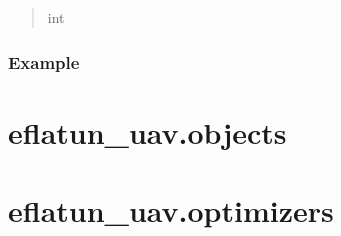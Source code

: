\documentclass[letterpaper,10pt,english]{sphinxmanual}
\begin{document}
\begin{fulllineitems}
\begin{quote}
\begin{description}
\sphinxAtStartPar
int

\end{description}\end{quote}
\subsubsection*{Example}

\begin{sphinxVerbatim}[commandchars=\\\{\}]
   
\end{sphinxVerbatim}

\end{fulllineitems}


\sphinxstepscope


\section{eflatun\_uav.objects}
\label{\detokenize{generated/eflatun_uav.objects:module-eflatun_uav.objects}}\label{\detokenize{generated/eflatun_uav.objects:eflatun-uav-objects}}\label{\detokenize{generated/eflatun_uav.objects::doc}}
\sphinxstepscope


\section{eflatun\_uav.optimizers}
\label{\detokenize{generated/eflatun_uav.optimizers:module-eflatun_uav.optimizers}}\label{\detokenize{generated/eflatun_uav.optimizers:eflatun-uav-optimizers}}\label{\detokenize{generated/eflatun_uav.optimizers::doc}}
\sphinxstepscope
\end{document}
